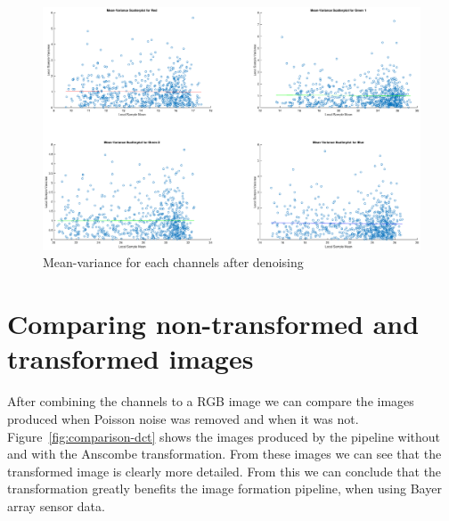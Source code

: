 \documentclass[12pt,a4paper,english
]{tunithesis}
\begin{document}
\begin{figure}
  \includegraphics[width=\textwidth]{img/clean-mean-variance.eps}
  \caption{Mean-variance for each channels after denoising}
  \label{fig:clean-mean-variance}
\end{figure}

\section{Comparing non-transformed and transformed images}
After combining the channels to a RGB image we can compare the images produced when Poisson noise was removed and when it was not. Figure~\ref{fig:comparison-dct} shows the images produced by the pipeline without and with the Anscombe transformation. From these images we can see that the transformed image is clearly more detailed. From this we can conclude that the transformation greatly benefits the image formation pipeline, when using Bayer array sensor data.
\end{document}
